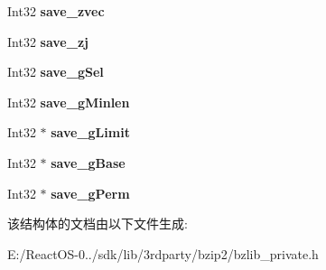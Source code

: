 \begin{DoxyCompactItemize}
Int32 {\bfseries save\+\_\+zvec}
\item 
\mbox{\label{struct_d_state_acc547664c9055ab2824d8200d97d80a6}} 
Int32 {\bfseries save\+\_\+zj}
\item 
\mbox{\label{struct_d_state_ab11e52fdc10a8aca598c2e620b889f89}} 
Int32 {\bfseries save\+\_\+g\+Sel}
\item 
\mbox{\label{struct_d_state_a6561d422a828c7df1c6b5a5aaa2c7efa}} 
Int32 {\bfseries save\+\_\+g\+Minlen}
\item 
\mbox{\label{struct_d_state_a5d0e068789a7f437cd36c773a5d65fd8}} 
Int32 $\ast$ {\bfseries save\+\_\+g\+Limit}
\item 
\mbox{\label{struct_d_state_aea79e00a8605ea7d8f65e15824ad35b9}} 
Int32 $\ast$ {\bfseries save\+\_\+g\+Base}
\item 
\mbox{\label{struct_d_state_a9c6bd9a53775182cea1bce61d020f3dc}} 
Int32 $\ast$ {\bfseries save\+\_\+g\+Perm}
\end{DoxyCompactItemize}


该结构体的文档由以下文件生成\+:\begin{DoxyCompactItemize}
\item 
E\+:/\+React\+O\+S-\/0../sdk/lib/3rdparty/bzip2/bzlib\+\_\+private.\+h\end{DoxyCompactItemize}
